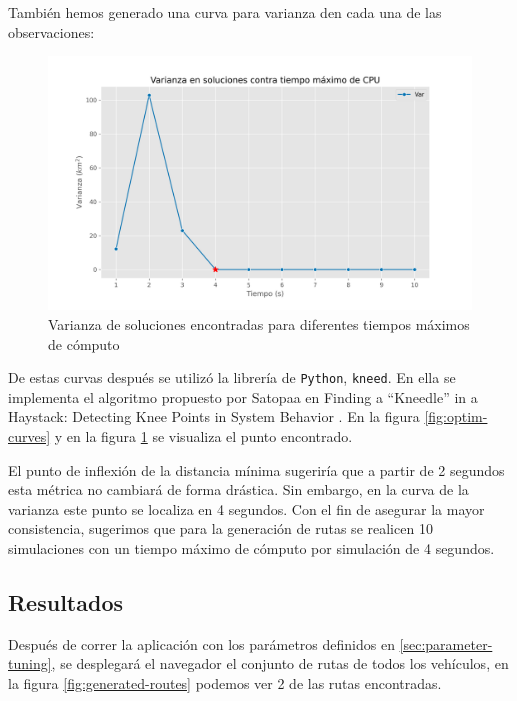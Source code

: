 \documentclass[journal]{IEEEtran}
\begin{document}
            También hemos generado una curva para varianza den cada una de las observaciones:

            \begin{figure}[h!]
                \centering
                \includegraphics[scale=0.35]{../img/varianza-opt.png}
                \caption{Varianza de soluciones encontradas para diferentes tiempos máximos de cómputo}
                \label{fig:optim-var}
            \end{figure}

            De estas curvas después se utilizó la librería de \texttt{Python}, \texttt{kneed}. En ella se implementa el algoritmo propuesto por Satopaa en Finding a “Kneedle” in a Haystack: Detecting Knee Points in System Behavior \cite{satopaa2011finding}. En la figura \ref{fig:optim-curves} y en la figura \ref{fig:optim-var} se visualiza el punto encontrado.

            El punto de inflexión de la distancia mínima sugeriría que a partir de 2 segundos esta métrica no cambiará de forma drástica. Sin embargo, en la curva de la varianza este punto se localiza en 4 segundos. Con el fin de asegurar la mayor consistencia, sugerimos que para la generación de rutas se realicen 10 simulaciones con un tiempo máximo de cómputo por simulación de 4 segundos.

        \subsection{Resultados} \label{sec:results}

            Después de correr la aplicación con los parámetros definidos en \ref{sec:parameter-tuning}, se desplegará el navegador el conjunto de rutas de todos los vehículos, en la figura \ref{fig:generated-routes} podemos ver 2 de las rutas encontradas.
        
\end{document}
